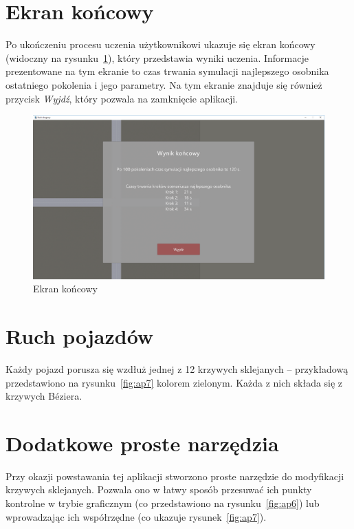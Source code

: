 \section*{Ekran końcowy}
Po ukończeniu procesu uczenia użytkownikowi ukazuje się ekran końcowy (widoczny na rysunku~\ref{fig:ap9}), który przedstawia wyniki uczenia. Informacje prezentowane na tym ekranie to czas trwania symulacji najlepszego osobnika ostatniego pokolenia i jego parametry. Na tym ekranie znajduje się również przycisk \textit{Wyjdź}, który pozwala na zamknięcie aplikacji.
\begin{figure}
	\centering
	\includegraphics[width=1\linewidth]{ap9}
	\caption[Ekran końcowy]{Ekran końcowy}
	\label{fig:ap9}
\end{figure}

\section*{Ruch pojazdów}
Każdy pojazd porusza się wzdłuż jednej z 12 krzywych sklejanych -- przykładową przedstawiono na rysunku~\ref{fig:ap7} kolorem zielonym. Każda z nich składa się z krzywych Béziera.
\section*{Dodatkowe proste narzędzia}Przy okazji powstawania tej aplikacji stworzono proste narzędzie do modyfikacji krzywych sklejanych. Pozwala ono w łatwy sposób przesuwać ich punkty kontrolne w trybie graficznym (co przedstawiono na rysunku~\ref{fig:ap6}) lub wprowadzając ich współrzędne (co ukazuje rysunek~\ref{fig:ap7}).
